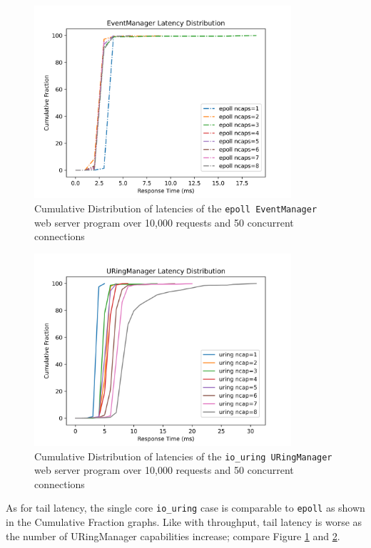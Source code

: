 \begin{figure}[ht]
    \centering
	\includegraphics[width=0.85\textwidth]{figures/graphics/epoll_latency.png}
	\caption[\texttt{epoll EventManager} Web Server Latency]{
		Cumulative Distribution of latencies of the \texttt{epoll EventManager} web server
		program over 10,000 requests and 50 concurrent connections
	}
	\label{fig:epoll_latency}
\end{figure}

\begin{figure}[ht]
    \centering
	\includegraphics[width=0.85\textwidth]{figures/graphics/uring_latency.png}
	\caption[\texttt{io\_uring URingManager} Web Server Latency]{
		Cumulative Distribution of latencies of the \texttt{io\_uring URingManager} web server
		program over 10,000 requests and 50 concurrent connections
	}
	\label{fig:uring_latency}
\end{figure} 


As for tail latency, the single core \texttt{io\_uring} case is comparable to
\texttt{epoll} as shown in the Cumulative Fraction graphs.
Like with throughput, tail latency is worse as the number of URingManager capabilities increase;
compare Figure \ref{fig:epoll_latency} and \ref{fig:uring_latency}.